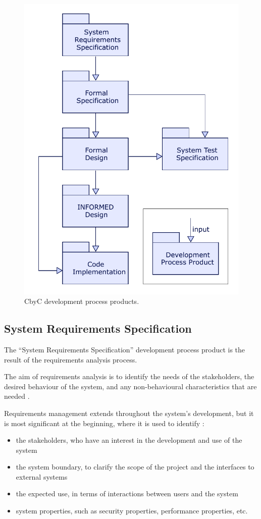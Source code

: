 \begin{figure}[H]
	\centering
	\includegraphics[scale=0.75]{Figures/CbyC_process.pdf}
	\decoRule
	\caption{CbyC development process products.}
	\label{fig:CbyCDev}
\end{figure}

\subsection{System Requirements Specification}

The ``System Requirements Specification'' development process product is the result
of the requirements analysis process.

The aim of requirements analysis is to identify the needs of the stakeholders, 
the desired behaviour of the system, and any non-behavioural characteristics that are needed \parencite{Tokeneer}. 

Requirements management extends throughout the system's development, but it is 
most significant at the beginning, where it is used to identify \parencite{Tokeneer}:
\begin{itemize}
	\item the stakeholders, who have an interest in the development and use of the system
	\item the system boundary, to clarify the scope of the project and the interfaces to external systems
	\item the expected use, in terms of interactions between users and the system
	\item system properties, such as security properties, performance properties, etc.
\end{itemize}

